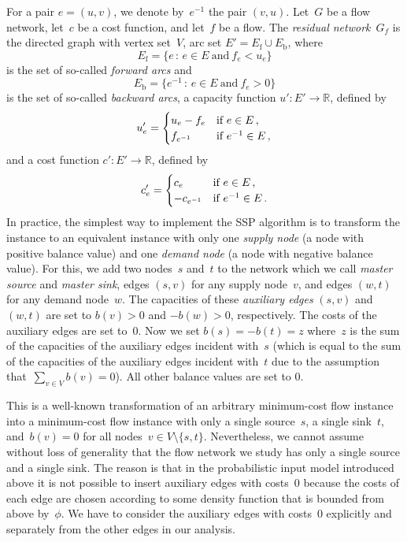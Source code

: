 \documentclass[11pt]{article}
\newcommand{\RR}{\mathbb{R}}
\newcommand{\DOT}{\,.}
\newcommand{\COMMA}{\,,}
\newcommand{\WHERE}{\,\colon\,}
\newcommand{\tIF}{\text{if}}
\newcommand{\tAND}{\text{and}}
\begin{document}
For a pair $e = (u, v)$, we denote by~$e^{-1}$ the pair $(v, u)$. Let~$G$ be a flow network, let~$c$ be a cost function, and let~$f$ be a flow. The \emph{residual network}~$G_f$ is the directed graph with vertex set~$V$, arc set $E' = E_\text{f} \cup E_\text{b}$, where
\[
  E_\text{f} = \bigl\{ e \WHERE e \in E \ \tAND\ f_e < u_e \bigr\}
\]
is the set of so-called \emph{forward arcs} and
\[
 E_\text{b} = \bigl\{ e^{-1} \WHERE e \in E \ \tAND\ f_e > 0 \bigr\}
\]
is the set of so-called \emph{backward arcs}, a capacity function $u' \colon E' \to \RR$, defined by
\[
  u'_e = \begin{cases}
    u_e - f_e & \tIF\ e \in E \COMMA \cr
    f_{e^{-1}} & \tIF\ e^{-1} \in E \COMMA
  \end{cases}
\]
and a cost function $c' \colon E' \to \RR$, defined by
\[
  c'_e = \begin{cases}
    c_e & \tIF\ e \in E \COMMA \cr
    -c_{e^{-1}} & \tIF\ e^{-1} \in E \DOT
  \end{cases}
\]
In practice, the simplest way to implement the SSP algorithm is to transform the instance to an equivalent instance with only one \emph{supply node} (a node with positive balance value) and one \emph{demand node} (a node with negative balance value). For this, we add two nodes~$s$ and~$t$ to the network which we call \emph{master source} and \emph{master sink}, edges $(s, v)$ for any supply node~$v$, and edges $(w, t)$ for any demand node~$w$. The capacities of these \emph{auxiliary edges} $(s, v)$ and $(w, t)$ are set to $b(v) > 0$ and $-b(w) > 0$, respectively. The costs of the auxiliary edges are set to~$0$. Now we set $b(s) = -b(t) = z$ where~$z$ is the sum of the capacities of the auxiliary edges incident with~$s$ (which is equal to the sum of the capacities of the auxiliary edges incident with~$t$ due to the assumption that~$\sum_{v \in V} b(v) = 0$). All other balance values are set to $0$.

This is a well-known transformation of an arbitrary minimum-cost flow instance into a minimum-cost flow instance with only a single source~$s$, a single sink~$t$, and~$b(v) = 0$ for all nodes~$v \in V\setminus\{s,t\}$. Nevertheless, we cannot assume without loss of generality that the flow network we study has only a single source and a single sink. The reason is that in the probabilistic input model introduced above it is not possible to insert auxiliary edges with costs~$0$ because the costs of each edge are chosen according to some density function that is bounded from above by~$\phi$. We have to consider the auxiliary edges with costs~$0$ explicitly and separately from the other edges in our analysis.
\end{document}
